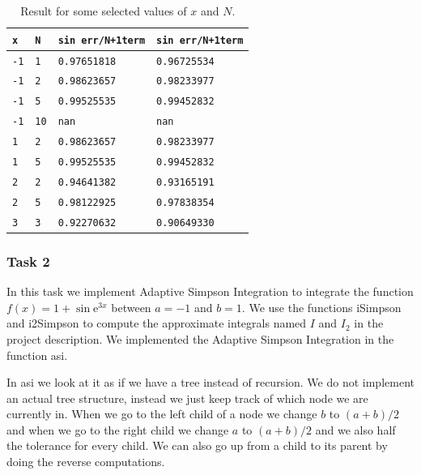 \documentclass[a4paper,10pt]{article}
\newcommand{\e}{\text{e}}
\begin{document}
\begin{table}[!ht]
\centering 
  \begin{minipage}[t]{105mm}
    \caption{
      Result for some selected values of $x$ and $N$.
    } 
    \label{TABtask1}
  \end{minipage}

  \vspace{5mm}
  \begin{tabular}{l l l l} 
    \texttt{x}&\texttt{N}&\texttt{sin err/N+1term} & \texttt{sin err/N+1term} \\
    \hline
    \texttt{-1}	& \texttt{1}	& \texttt{0.97651818} & \texttt{0.96725534} 	\\
    \texttt{-1}	& \texttt{2}	& \texttt{0.98623657} & \texttt{0.98233977} 	\\
    \texttt{-1}	& \texttt{5}	& \texttt{0.99525535} & \texttt{0.99452832} 	\\
    \texttt{-1}	& \texttt{10}	& \texttt{nan} & \texttt{nan} 	\\
    \hline 
    \texttt{1}	& \texttt{2}	& \texttt{0.98623657} & \texttt{0.98233977} 	\\
    \texttt{1}	& \texttt{5}	& \texttt{0.99525535} & \texttt{0.99452832} 	\\
    \hline
    \texttt{2}	& \texttt{2} 	& \texttt{0.94641382} & \texttt{0.93165191}	\\
    \texttt{2}	& \texttt{5}	& \texttt{0.98122925} & \texttt{0.97838354}	\\
    \hline
    \texttt{3}	& \texttt{3}	& \texttt{0.92270632} & \texttt{0.90649330}	\\
  \end{tabular}
\end{table}

\FloatBarrier

\subsubsection*{Task 2}
In this task we implement Adaptive Simpson Integration to integrate the function $f(x) = 1 + \sin \e ^{3x}$ between $a=-1$ and $b=1$. We use the functions iSimpson and i2Simpson to compute the approximate integrals named $I$ and $I_2$ in the project description. We implemented the Adaptive Simpson Integration in the function asi.

In asi we look at it as if we have a tree instead of recursion. We do not implement an actual tree structure, instead we just keep track of which node we are currently in. When we go to the left child of a node we change $b$ to $(a+b)/2$ and when we go to the right child we change $a$ to $(a+b)/2$ and we also half the tolerance for every child. We can also go up from a child to its parent by doing the reverse computations.
\end{document}
